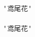\documentclass{ctexart}
\begin{document}
\begin{Verbatim}
'鸢尾花'
\end{Verbatim}
\begin{verbatim}
'鸢尾花'
\end{verbatim}
\end{document}
